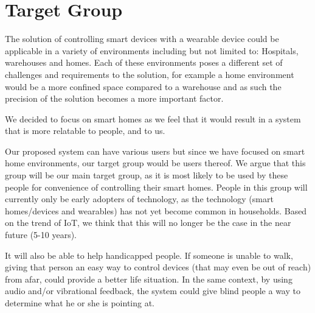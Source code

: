 \section{Target Group}\label{sec:target-group}

The solution of controlling smart devices with a wearable device could be applicable in a variety of environments including but not limited to: Hospitals, warehouses and homes.
Each of these environments poses a different set of challenges and requirements to the solution, for example a home environment would be a more confined space compared to a warehouse and as such the precision of the solution becomes a more important factor.

We decided to focus on smart homes as we feel that it would result in a system that is more relatable to people, and to us.

Our proposed system can have various users but since we have focused on smart home environments, 
our target group would be users thereof. 
We argue that this group will be our main target group, 
as it is most likely to be used by these people for convenience of controlling their smart homes. 
People in this group will currently only be early adopters of technology, 
as the technology (smart homes/devices and wearables) has not yet become common in households.
Based on the trend of IoT, we think that this will no longer be the case in the near future (5-10 years). 

It will also be able to help handicapped people. 
If someone is unable to walk, 
giving that person an easy way to control devices (that may even be out of reach) from afar, 
could provide a better life situation. 
In the same context, by using audio and/or vibrational feedback, 
the system could give blind people a way to determine what he or she is pointing at. 
